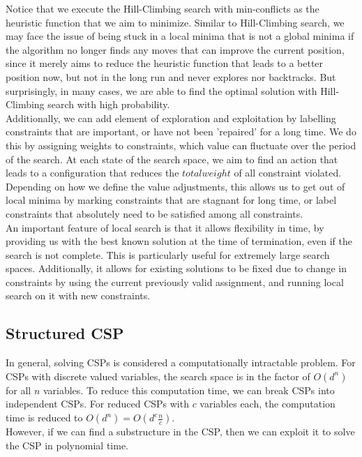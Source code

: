 \documentclass[12pt]{article}
\begin{document}
Notice that we execute the Hill-Climbing search with min-conflicts as the heuristic function that we aim to minimize. Similar to Hill-Climbing search, we may face the issue of being stuck in a local minima that is not a global minima if the algorithm no longer finds any moves that can improve the current position, since it merely aims to reduce the heuristic function that leads to a better position now, but not in the long run and never explores nor backtracks. But surprisingly, in many cases, we are able to find the optimal solution with Hill-Climbing search with high probability.\\

Additionally, we can add element of exploration and exploitation by labelling constraints that are important, or have not been 'repaired' for a long time. We do this by assigning weights to constraints, which value can fluctuate over the period of the search. At each state of the search space, we aim to find an action that leads to a configuration that reduces the $total weight$ of all constraint violated. Depending on how we define the value adjustments, this allows us to get out of local minima by marking constraints that are stagnant for long time, or label constraints that absolutely need to be satisfied among all constraints.\\

An important feature of local search is that it allows flexibility in time, by providing us with the best known solution at the time of termination, even if the search is not complete. This is particularly useful for extremely large search spaces. Additionally, it allows for existing solutions to be fixed due to change in constraints by using the current previously valid assignment, and running local search on it with new constraints. 

\subsection{Structured CSP}

In general, solving CSPs is considered a computationally intractable problem. For CSPs with discrete valued variables, the search space is in the factor of $O(d^n)$ for all $n$ variables. To reduce this computation time, we can break CSPs into independent CSPs. For reduced CSPs with $c$ variables each, the computation time is reduced to $O(d^n) = O(d^c\frac{n}{c})$.\\

However, if we can find a substructure in the CSP, then we can exploit it to solve the CSP in polynomial time.
\end{document}
